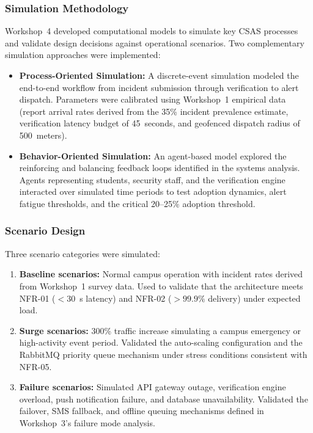 \documentclass[11pt,a4paper]{article}
\begin{document}
\subsubsection{Simulation Methodology}

Workshop~4 developed computational models to simulate key CSAS processes and validate design decisions against operational scenarios. Two complementary simulation approaches were implemented:

\begin{itemize}
\item \textbf{Process-Oriented Simulation:} A discrete-event simulation modeled the end-to-end workflow from incident submission through verification to alert dispatch. Parameters were calibrated using Workshop~1 empirical data (report arrival rates derived from the 35\% incident prevalence estimate, verification latency budget of 45~seconds, and geofenced dispatch radius of 500~meters).

\item \textbf{Behavior-Oriented Simulation:} An agent-based model explored the reinforcing and balancing feedback loops identified in the systems analysis. Agents representing students, security staff, and the verification engine interacted over simulated time periods to test adoption dynamics, alert fatigue thresholds, and the critical 20--25\% adoption threshold.
\end{itemize}

\subsubsection{Scenario Design}

Three scenario categories were simulated:

\begin{enumerate}
\item \textbf{Baseline scenarios:} Normal campus operation with incident rates derived from Workshop~1 survey data. Used to validate that the architecture meets NFR-01 ($<30$~s latency) and NFR-02 ($>99.9\%$ delivery) under expected load.

\item \textbf{Surge scenarios:} 300\% traffic increase simulating a campus emergency or high-activity event period. Validated the auto-scaling configuration and the RabbitMQ priority queue mechanism under stress conditions consistent with NFR-05.

\item \textbf{Failure scenarios:} Simulated API gateway outage, verification engine overload, push notification failure, and database unavailability. Validated the failover, SMS fallback, and offline queuing mechanisms defined in Workshop~3's failure mode analysis.
\end{enumerate}
\end{document}
